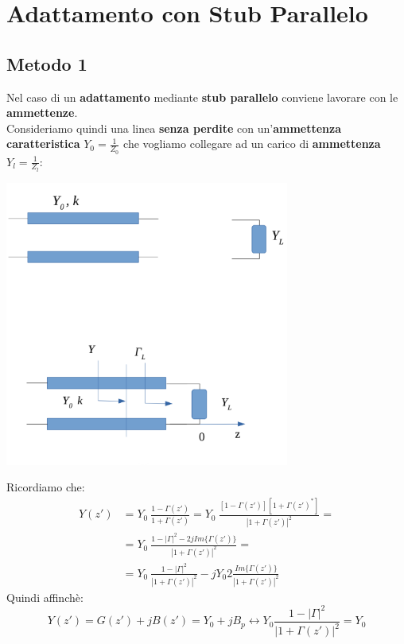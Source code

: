 \section{Adattamento con Stub Parallelo}
\subsection{Metodo 1}
Nel caso di un \textbf{adattamento} mediante \textbf{stub parallelo} conviene lavorare con le \textbf{ammettenze}.\\
Consideriamo quindi una linea \textbf{senza perdite} con un'\textbf{ammettenza caratteristica} $Y_0 = \frac{1}{Z_0}$ che vogliamo collegare ad un carico di \textbf{ammettenza} $Y_l = \frac{1}{Z_l}$:
\begin{center}
    \includegraphics[width=0.7\textwidth]{Images/figure25.png}
\end{center}
Ricordiamo che:
\begin{equation*}
\begin{aligned}
     Y(z') &= Y_0 \ \frac{1 - \Gamma(z')}{1 + \Gamma(z')} = Y_0 \ \frac{[1 - \Gamma(z')][1 + {\Gamma(z')}^*]}{{|1 + \Gamma(z')|}^2} =\\
     &= Y_0 \ \frac{1 - |\Gamma|^2 - 2j Im\{\Gamma(z')\}}{|1 + \Gamma(z')|^2} =\\
     &=Y_0 \ \frac{1 - |\Gamma|^2 }{|1 + \Gamma(z')|^2} - j Y_0 2 \frac{Im\{\Gamma(z')\}}{{|1 + \Gamma(z')|}^2}
\end{aligned}
\end{equation*}
Quindi affinchè:
\begin{equation*}
    Y(z') = G(z') + j B(z') = Y_0 + j B_p \leftrightarrow Y_0 \frac{1 - |\Gamma|^2 }{|1 + \Gamma(z')|^2} = Y_0
\end{equation*}
